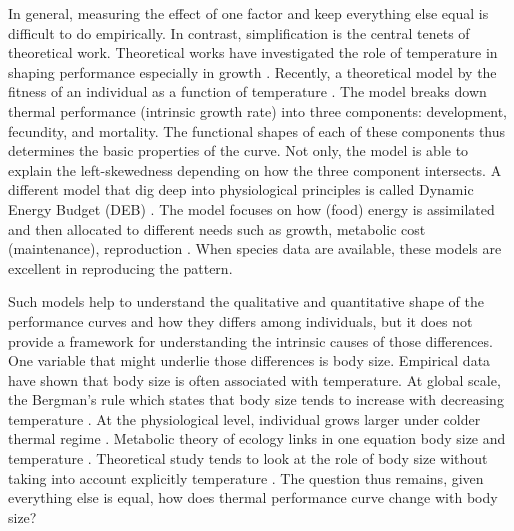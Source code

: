 In general, measuring the effect of one factor and keep everything else equal  is difficult to do empirically.
In contrast, simplification is the central tenets of theoretical work.
Theoretical works have investigated the role of temperature in shaping performance especially in growth \citep{VandH1996,Koslowski2004}.
Recently, a theoretical model by \citet{Amarasekare2012} the fitness of an individual as a function of temperature \citep{Amarasekare2012}.
The model  breaks down thermal performance (intrinsic growth rate)  into three components: development, fecundity, and mortality.
The functional shapes of each of these components thus determines the basic properties of the curve.
Not only, the model is able to explain the left-skewedness depending on how the three component intersects. 
A different model that dig deep into physiological principles is called Dynamic Energy Budget (DEB) \citep{Kooijman2009}.
The model focuses on how (food) energy is assimilated and then allocated to different needs such as growth, metabolic cost (maintenance), reproduction \citep{Kooijman2009}.
When species data are available, these models are excellent in reproducing the pattern. 

Such models help to understand the qualitative and quantitative shape of the performance curves and how they differs  among individuals, but it does not provide a framework for understanding the intrinsic causes of those differences. %
One variable that might underlie those differences is body size.
Empirical data have shown that body size is often associated with temperature.  
At global scale, the Bergman's rule which states that body size tends to increase with decreasing temperature \citep{Bergman1847}.
At the physiological level, individual grows larger under colder thermal regime \citep{Van1996}.
Metabolic theory of ecology links in one equation body size and temperature \citep{Brown2004}.
Theoretical study tends to look at the role of body size without taking into account explicitly temperature \citep[e.g.,]{Yodzis1992, Brown1993}.
The question thus remains, given everything else is equal, how does thermal performance curve change with body size? %

